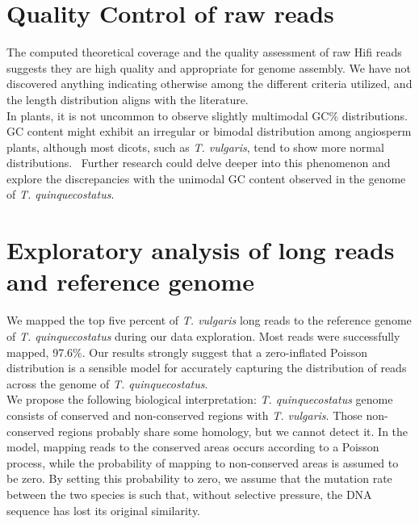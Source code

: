 \section*{Quality Control of raw reads}

The computed theoretical coverage and the quality assessment of raw Hifi reads suggests they are high quality and appropriate for genome assembly. We have not discovered anything indicating otherwise among the different criteria utilized, and the length distribution aligns with the literature.~\cite{honHighlyAccurateLongread2020}\\

In plants, it is not uncommon to observe slightly multimodal GC\% distributions. GC content might exhibit an irregular or bimodal distribution among angiosperm plants, although most dicots, such as \textit{T. vulgaris}, tend to show more normal distributions.~\cite{bowersGCContentPlant2022} Further research could delve deeper into this phenomenon and explore the discrepancies with the unimodal GC content observed in the genome of \textit{T. quinquecostatus}.~\cite{sunChromosomelevelAssemblyAnalysis2022}\\

\section*{Exploratory analysis of long reads and reference genome}

We mapped the top five percent of \textit{T. vulgaris} long reads to the reference genome of \textit{T. quinquecostatus} during our data exploration. Most reads were successfully mapped, 97.6\%. Our results strongly suggest that a zero-inflated Poisson distribution is a sensible model for accurately capturing the distribution of reads across the genome of  \textit{T. quinquecostatus}.\\

We propose the following biological interpretation: \textit{T. quinquecostatus} genome consists of conserved and non-conserved regions with \textit{T. vulgaris}. Those non-conserved regions probably share some homology, but we cannot detect it. In the model, mapping reads to the conserved areas occurs according to a Poisson process, while the probability of mapping to non-conserved areas is assumed to be zero. By setting this probability to zero, we assume that the mutation rate between the two species is such that, without selective pressure, the DNA sequence has lost its original similarity.\\
 

